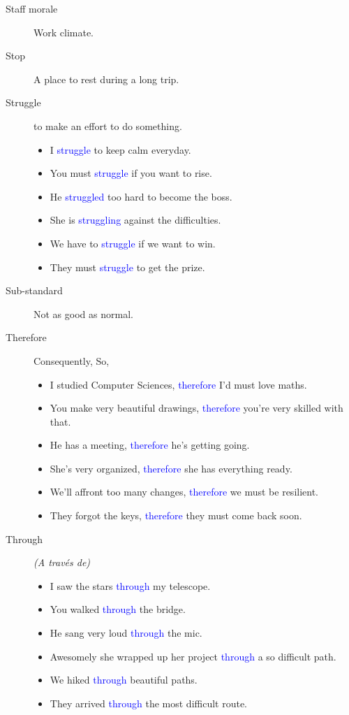 \begin{multicols}{2}
\begin{description}
\item[Staff morale] Work climate.

\item[Stop] A place to rest during a long trip.

\item[Struggle] to make an effort to do something.
\begin{itemize}
\item I \textcolor{blue}{struggle} to keep calm everyday.
\item You must \textcolor{blue}{struggle} if you want to rise.
\item He \textcolor{blue}{struggled} too hard to become the boss.
\item She is \textcolor{blue}{struggling} against the difficulties.
\item We have to \textcolor{blue}{struggle} if we want to win.
\item They must \textcolor{blue}{struggle} to get the prize.
\end{itemize}

\item[Sub-standard] Not as good as normal.

\item[Therefore] Consequently, So, 
\begin{itemize}
\item I studied Computer Sciences, \textcolor{blue}{therefore} I'd must love maths.
\item You make very beautiful drawings, \textcolor{blue}{therefore} you're very skilled with that.
\item He has a meeting, \textcolor{blue}{therefore} he's getting going.
\item She's very organized, \textcolor{blue}{therefore} she has everything ready.
\item We'll affront too many changes, \textcolor{blue}{therefore} we must be resilient.
\item They forgot the keys, \textcolor{blue}{therefore} they must come back soon.
\end{itemize}

\item[Through] \emph{(A través de)}
\begin{itemize}
\item I saw the stars \textcolor{blue}{through} my telescope.
\item You walked \textcolor{blue}{through} the bridge.
\item He sang very loud \textcolor{blue}{through} the mic.
\item Awesomely she wrapped up her project \textcolor{blue}{through} a so difficult path.
\item We hiked \textcolor{blue}{through} beautiful paths.
\item They arrived \textcolor{blue}{through} the most difficult route.
\end{itemize}


\end{description}
\end{multicols}
